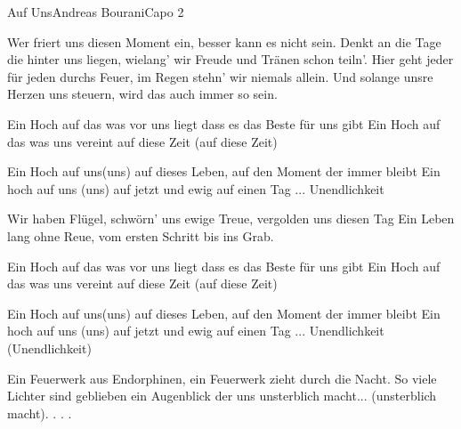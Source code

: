\begin{song}{Auf Uns}{Andreas Bourani}{Capo 2}


Wer friert uns diesen Moment ein, besser kann es nicht sein.
Denkt an die Tage die hinter uns liegen,
wielang' wir Freude und Tränen schon teiln'.
Hier geht jeder für jeden durchs Feuer,
im Regen stehn' wir niemals allein.
Und solange unsre Herzen uns steuern, wird das auch immer so sein.

Ein Hoch auf das was vor uns liegt dass es das Beste für uns gibt
Ein Hoch auf das was uns vereint auf diese Zeit (auf diese Zeit)

Ein Hoch auf uns(uns) auf dieses Leben,
auf den Moment der immer bleibt
Ein hoch auf uns (uns) auf jetzt und ewig
auf einen Tag ... Unendlichkeit

Wir haben Flügel, schwörn' uns ewige Treue, vergolden uns diesen Tag
Ein Leben lang ohne Reue, vom ersten Schritt bis ins Grab.

Ein Hoch auf das was vor uns liegt dass es das Beste für uns gibt
Ein Hoch auf das was uns vereint auf diese Zeit (auf diese Zeit)

Ein Hoch auf uns(uns) auf dieses Leben,
auf den Moment der immer bleibt
Ein hoch auf uns (uns) auf jetzt und ewig
auf einen Tag ... Unendlichkeit (Unendlichkeit)

Ein Feuerwerk aus Endorphinen, ein Feuerwerk zieht durch die Nacht.
So viele Lichter sind geblieben
ein Augenblick der uns unsterblich macht... (unsterblich macht). . . .


\end{song}
